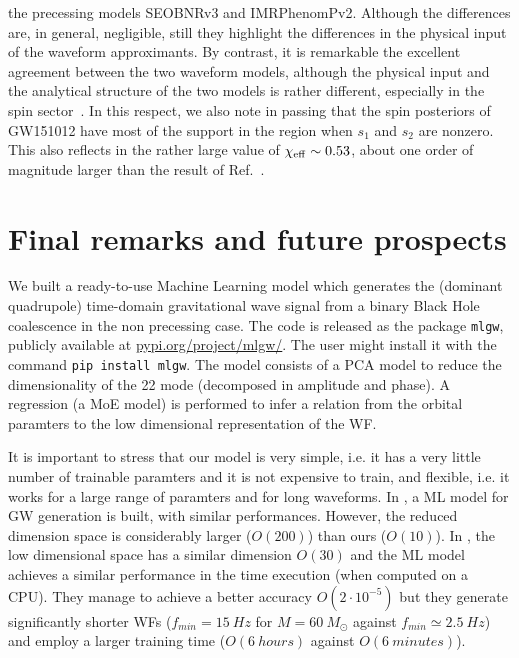 the precessing models SEOBNRv3 and IMRPhenomPv2. Although the differences 
are, in general, negligible, still they highlight the differences in the physical input of 
the waveform approximants. By contrast, it is remarkable the excellent agreement between the
two waveform models, although the physical input and the analytical structure of the
two models is rather different, especially in the spin sector~\cite{Rettegno:2019tzh}.
In this respect, we also note in passing that the spin posteriors of GW151012 have
most of the support in the region when $s_1$ and $s_2$ are nonzero. This also
reflects in the rather large value of $\chi_{\rm eff}\sim 0.53$, about one order of magnitude
larger than the result of Ref.~\cite{LIGOScientific:2018mvr}.

\section{Final remarks and future prospects}
\label{sec:end}
We built a ready-to-use Machine Learning model which generates the (dominant quadrupole) time-domain gravitational wave signal from a binary Black Hole coalescence in the non precessing case. The code is released as the package \texttt{mlgw}, publicly available at
\href{https://pypi.org/project/mlgw/}{pypi.org/project/mlgw/}. The user might install it with the command \texttt{pip install mlgw}.
The model consists of a PCA model to reduce the dimensionality of the 22 mode (decomposed in amplitude and phase). A regression (a MoE model) is performed to infer a relation from the orbital paramters to the low dimensional representation of the WF.
\par
It is important to stress that our model is very simple, i.e. it has a very little number of trainable paramters and it is not expensive to train, and flexible, i.e. it works for a large range of paramters and for long waveforms.
In \cite{Chua_2019}, a ML model for GW generation is built, with similar performances. However, the reduced dimension space is considerably larger ($O(200)$) than ours ($O(10)$).
In \cite{Khan:2020fso}, the low dimensional space has a similar dimension $O(30)$ and the ML model achieves a similar performance in the time execution (when computed on a CPU). They manage to achieve a better accuracy $O(2\cdot10^{-5})$ but they generate significantly shorter WFs ($f_{min} = \SI{15}{Hz}$ for $M = \SI{60}{M_{\odot}}$ against $f_{min} \simeq \SI{2.5}{Hz}$) and employ a larger training time ($O(\SI{6}{hours})$ against $O(\SI{6}{minutes})$).
\par
